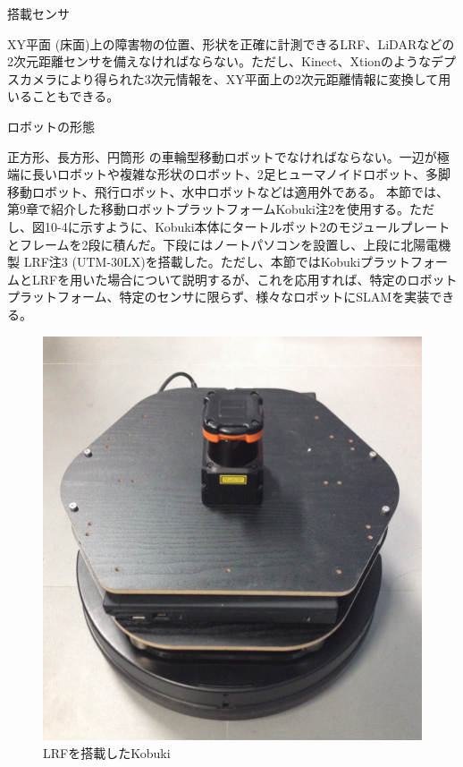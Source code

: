 \circled{\thenum} 搭載センサ

XY平面 (床面)上の障害物の位置、形状を正確に計測できるLRF、LiDARなどの2次元距離センサを備えなければならない。ただし、Kinect、Xtionのようなデプスカメラにより得られた3次元情報を、XY平面上の2次元距離情報に変換して用いることもできる。

\circled{\thenum} ロボットの形態

正方形、長方形、円筒形 の車輪型移動ロボットでなければならない。一辺が極端に長いロボットや複雑な形状のロボット、2足ヒューマノイドロボット、多脚移動ロボット、飛行ロボット、水中ロボットなどは適用外である。
本節では、第9章で紹介した移動ロボットプラットフォームKobuki注2を使用する。ただし、図10-4に示すように、Kobuki本体にタートルボット2のモジュールプレートとフレームを2段に積んだ。下段にはノートパソコンを設置し、上段に北陽電機製 LRF注3  (UTM-30LX)を搭載した。ただし、本節ではKobukiプラットフォームとLRFを用いた場合について説明するが、これを応用すれば、特定のロボットプラットフォーム、特定のセンサに限らず、様々なロボットにSLAMを実装できる。

\begin{figure}[htp]
  \centering
  \includegraphics[width=\columnwidth]{pictures/chapter10/pic_10_04.png}
  \caption{LRFを搭載したKobuki}
\end{figure}

